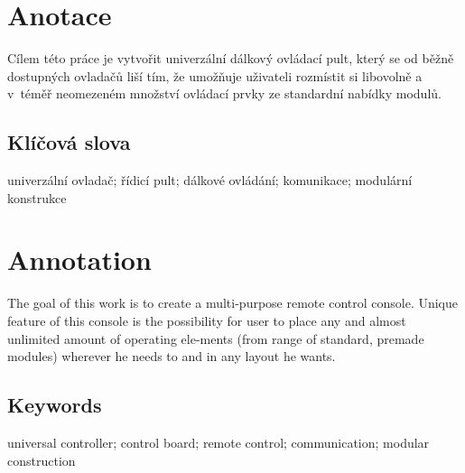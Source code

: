 \documentclass{template/socthesis}
\author{Šimon Hrouda}
\begin{document}
\maketitle



\pagestyle{empty}

\section*{Anotace}
Cílem této práce je vytvořit univerzální dálkový ovládací pult, který se od běžně dostupných ovladačů liší tím, že umožňuje uživateli rozmístit si libovolně a v~téměř neomezeném množství ovládací prvky ze standardní nabídky modulů.

\subsection*{Klíčová slova}
univerzální ovladač; řídicí pult; dálkové ovládání; komunikace; modulární konstrukce

\vspace{20mm}

\section*{Annotation}
The goal of this work is to create a multi-purpose remote control console.
Unique feature of this console is the possibility for user to place any and almost unlimited amount of operating ele-ments (from range of standard, premade modules) wherever he needs to and in any layout he wants.

\subsection*{Keywords}
universal controller; control board; remote control; communication; modular construction

\newpage
\pagestyle{plain}

\tableofcontents %

\setcounter{figure}{0}
\setcounter{table}{0}
\newpage
\end{document}
